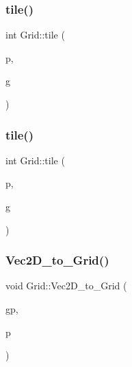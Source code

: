 \subsubsection{\texorpdfstring{tile()}{tile()}\hspace{0.1cm}{\footnotesize\ttfamily [2/3]}}
{\footnotesize\ttfamily int Grid\+::tile (\begin{DoxyParamCaption}\item[{\mbox{\hyperlink{struct_grid_1_1_point}{Point}} $\ast$}]{p,  }\item[{\mbox{\hyperlink{struct_grid_1_1_grid}{Grid}} $\ast$}]{g }\end{DoxyParamCaption})\hspace{0.3cm}{\ttfamily [inline]}}

\mbox{\label{namespace_grid_a90730af11e3c4c1272d81ce712c29625}} 
\subsubsection{\texorpdfstring{tile()}{tile()}\hspace{0.1cm}{\footnotesize\ttfamily [3/3]}}
{\footnotesize\ttfamily int Grid\+::tile (\begin{DoxyParamCaption}\item[{\mbox{\hyperlink{struct_vec2_d_1_1_vec2_d}{Vec2\+D\+::\+Vec2D}} $\ast$}]{p,  }\item[{\mbox{\hyperlink{struct_grid_1_1_grid}{Grid}} $\ast$}]{g }\end{DoxyParamCaption})\hspace{0.3cm}{\ttfamily [inline]}}

\mbox{\label{namespace_grid_a07bf38e1a6daf3be9ad0d8b1527fcab2}} 
\subsubsection{\texorpdfstring{Vec2\+D\+\_\+to\+\_\+\+Grid()}{Vec2D\_to\_Grid()}}
{\footnotesize\ttfamily void Grid\+::\+Vec2\+D\+\_\+to\+\_\+\+Grid (\begin{DoxyParamCaption}\item[{\mbox{\hyperlink{struct_grid_1_1_point}{Point}} $\ast$}]{gp,  }\item[{\mbox{\hyperlink{struct_vec2_d_1_1_vec2_d}{Vec2\+D\+::\+Vec2D}} $\ast$}]{p }\end{DoxyParamCaption})\hspace{0.3cm}{\ttfamily [inline]}}

